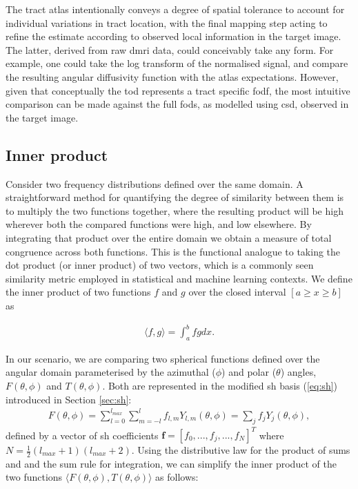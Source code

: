 \documentclass[12pt,phd,a4paper,twoside]{ucl_thesis}
\begin{document}
The tract atlas intentionally conveys a degree of spatial tolerance to account for individual variations in tract location, with the final mapping step acting to refine the estimate according to observed local information in the target image.
The latter, derived from raw \gls{dmri} data, could conceivably take any form.
For example, one could take the log transform of the normalised signal, and compare the resulting angular diffusivity function with the atlas expectations. However, given that conceptually the \gls{tod} represents a tract specific \gls{fodf}, the most intuitive comparison can be made against the full \glspl{fod}, as modelled using \gls{csd}, observed in the target image.

\subsection{Inner product}\label{sec:ip}

Consider two frequency distributions defined over the same domain.
A straightforward method for quantifying the degree of similarity between them is to multiply the two functions together, where the resulting product will be high wherever both the compared functions were high, and low elsewhere.
By integrating that product over the entire domain we obtain a measure of total congruence across both functions.
This is the functional analogue to taking the dot product (or inner product) of two vectors, which is a commonly seen similarity metric employed in statistical and machine learning contexts.
We define the inner product of two functions $f$ and $g$ over the closed interval $[a \geq x \geq b]$ as

\begin{align}
  \langle f,g \rangle = \int_a^b f g dx.
\end{align}

In our scenario, we are comparing two spherical functions defined over the angular domain parameterised by the azimuthal ($\phi$) and polar ($\theta$) angles, $F(\theta, \phi)$ and $T(\theta, \phi)$.
Both are represented in the modified \gls{sh} basis (\ref{eq:sh}) introduced in Section \ref{sec:sh}:
\begin{align}
  F(\theta, \phi) = \sum_{l=0}^{l_{max}} \sum_{m=-l}^l f_{l,m} Y_{l,m}(\theta, \phi) = \sum_j f_jY_j(\theta, \phi),
\end{align}
defined by a vector of \gls{sh} coefficients $\mathbf{f} = [f_0, ..., f_j, ..., f_N]^T$ where $N = \frac{1}{2}(l_{max}+1)(l_{max}+2)$.
Using the distributive law for the product of sums and and the sum rule for integration, we can simplify the inner product of the two functions $\langle F(\theta, \phi), T(\theta, \phi) \rangle$ as follows:
\end{document}

